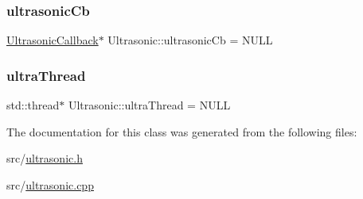 \mbox{\label{classUltrasonic_a00cb643880cff1ac6b3b429e92c5bba9}} 
\subsubsection{\texorpdfstring{ultrasonic\+Cb}{ultrasonicCb}}
{\footnotesize\ttfamily \hyperlink{classUltrasonicCallback}{Ultrasonic\+Callback}$\ast$ Ultrasonic\+::ultrasonic\+Cb = N\+U\+LL\hspace{0.3cm}{\ttfamily [private]}}

\mbox{\label{classUltrasonic_a830f5b7f4e3de362e1b90eb5d6f3844b}} 
\subsubsection{\texorpdfstring{ultra\+Thread}{ultraThread}}
{\footnotesize\ttfamily std\+::thread$\ast$ Ultrasonic\+::ultra\+Thread = N\+U\+LL\hspace{0.3cm}{\ttfamily [private]}}



The documentation for this class was generated from the following files\+:\begin{DoxyCompactItemize}
\item 
src/\hyperlink{ultrasonic_8h}{ultrasonic.\+h}\item 
src/\hyperlink{ultrasonic_8cpp}{ultrasonic.\+cpp}\end{DoxyCompactItemize}
